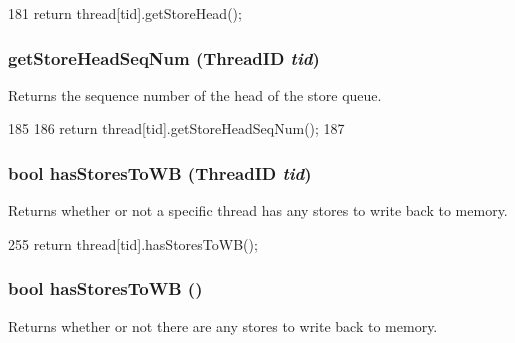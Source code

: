 \begin{DoxyCode}
181     { return thread[tid].getStoreHead(); }
\end{DoxyCode}
\hypertarget{classLSQ_a12f6a1158c09e1531b46d0aafb4e2ae4}{
\subsubsection[{getStoreHeadSeqNum}]{ getStoreHeadSeqNum ({\bf ThreadID} {\em tid})}}
\label{classLSQ_a12f6a1158c09e1531b46d0aafb4e2ae4}
Returns the sequence number of the head of the store queue. 


\begin{DoxyCode}
185     {
186         return thread[tid].getStoreHeadSeqNum();
187     }
\end{DoxyCode}
\hypertarget{classLSQ_a7e6f40e5ef3dbfe9d3d8da2dbeaf2b91}{
\subsubsection[{hasStoresToWB}]{\setlength{\rightskip}{0pt plus 5cm}bool hasStoresToWB ({\bf ThreadID} {\em tid})}}
\label{classLSQ_a7e6f40e5ef3dbfe9d3d8da2dbeaf2b91}
Returns whether or not a specific thread has any stores to write back to memory. 


\begin{DoxyCode}
255     { return thread[tid].hasStoresToWB(); }
\end{DoxyCode}
\hypertarget{classLSQ_ad2e4b46255cfb53e85522adeed4e2089}{
\subsubsection[{hasStoresToWB}]{\setlength{\rightskip}{0pt plus 5cm}bool hasStoresToWB ()}}
\label{classLSQ_ad2e4b46255cfb53e85522adeed4e2089}
Returns whether or not there are any stores to write back to memory. 


